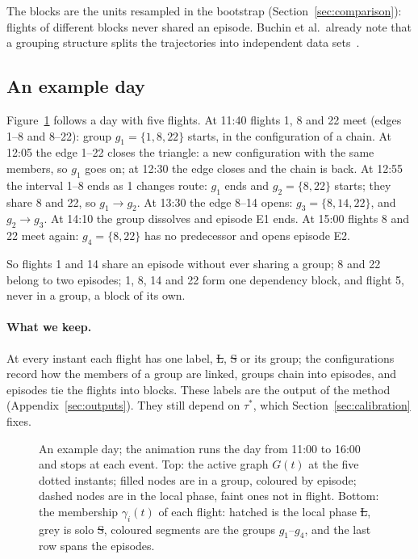The blocks are the units resampled in the bootstrap (Section~\ref{sec:comparison}): flights of
different blocks never shared an episode. Buchin et al.\ already note that a grouping structure
splits the trajectories into independent data sets~\cite[§1]{buchin2015}.

\subsection{An example day}\label{sec:example-day}

Figure~\ref{fig:day} follows a day with five flights. At 11:40 flights 1, 8 and 22 meet (edges
1--8 and 8--22): group $g_1=\{1,8,22\}$ starts, in the configuration of a chain. At 12:05 the
edge 1--22 closes the triangle: a new configuration with the same members, so $g_1$ goes on; at
12:30 the edge closes and the chain is back. At 12:55 the interval 1--8 ends as 1 changes route:
$g_1$ ends and $g_2=\{8,22\}$ starts; they share 8 and 22, so $g_1\to g_2$. At 13:30 the edge
8--14 opens: $g_3=\{8,14,22\}$, and $g_2\to g_3$. At 14:10 the group dissolves and episode E1
ends. At 15:00 flights 8 and 22 meet again: $g_4=\{8,22\}$ has no predecessor and opens episode
E2.

So flights 1 and 14 share an episode without ever sharing a group; 8 and 22 belong to two
episodes; 1, 8, 14 and 22 form one dependency block, and flight 5, never in a group, a block of
its own.

\paragraph{What we keep.} At every instant each flight has one label, \st{L}, \st{S} or its
group; the configurations record how the members of a group are linked, groups chain into
episodes, and episodes tie the flights into blocks.
These labels are the output of the method (Appendix~\ref{sec:outputs}). They still depend on
$\tau^*$, which Section~\ref{sec:calibration} fixes.

\begin{figure}
\centering
{}
\caption{\animmark An example day; the animation runs the day from 11:00 to 16:00 and stops at
each event. Top: the active graph $G(t)$ at the five dotted instants; filled nodes are in a
group, coloured by episode; dashed nodes are in the local phase, faint ones not in flight. Bottom:
the membership $\gamma_i(t)$ of each flight: hatched is the local phase \st{L}, grey is solo
\st{S}, coloured segments are the groups $g_1$--$g_4$, and the last row spans the episodes.}
\label{fig:day}
\end{figure}
